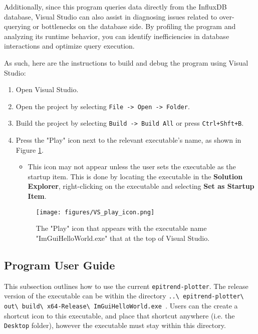 \documentclass{article}
\begin{document}
\vspace{2pt}
\noindent
Additionally, since this program queries data directly from the InfluxDB database, Visual Studio can also assist in diagnosing issues related to over-querying or bottlenecks on the database side. By profiling the program and analyzing its runtime behavior, you can identify inefficiencies in database interactions and optimize query execution.

\vspace{2pt}
\noindent
As such, here are the instructions to build and debug the program using Visual Studio:

\begin{enumerate}
    \item Open Visual Studio.

    \item Open the project by selecting \texttt{File -> Open -> Folder}.

    \item Build the project by selecting \texttt{Build -> Build All} or press \texttt{Ctrl+Shft+B}.

    \item Press the "Play" icon next to the relevant executable's name, as shown in Figure \ref{fig:VS_play_icon}.
    \begin{itemize}
        \item This icon may not appear unless the user sets the executable as the startup item. This is done by locating the executable in the \textbf{Solution Explorer}, right-clicking on the executable and selecting \textbf{Set as Startup Item}.
    \end{itemize}

    \begin{figure} [h]
        \centering
        \texttt{[image: figures/VS\_play\_icon.png]}
        \caption{\label{fig:VS_play_icon} The "Play" icon that appears with the executable name "ImGuiHelloWorld.exe" that at the top of Visual Studio.}
    \end{figure}
\end{enumerate}

\newpage

\subsection{Program User Guide}
This subsection outlines how to use the current \texttt{epitrend-plotter}. The release version of the executable can be within the directory 
\texttt{..\textbackslash
epitrend-plotter\textbackslash
out\textbackslash
build\textbackslash
x64-Release\textbackslash
ImGuiHelloWorld.exe
}. Users can the create a shortcut icon to this executable, and place that shortcut anywhere (i.e. the \texttt{Desktop} folder), however the executable must stay within this directory.
\end{document}
